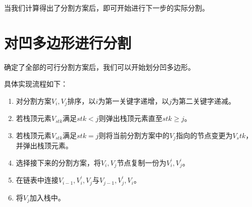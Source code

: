 当我们计算得出了分割方案后，即可开始进行下一步的实际分割。

\section{对凹多边形进行分割}

确定了全部的可行分割方案后，我们可以开始划分凹多边形。

具体实现流程如下：
\begin{enumerate}
    \item 对分割方案\(V_i,V_j\)排序，以\(i\)为第一关键字递增，以\(j\)为第二关键字递减。
    \item 若栈顶元素\(V_{stk}\)满足\(stk<j\)则弹出栈顶元素直至\(stk\ge j\)。
    \item 若栈顶元素\(V_{stk}\)满足\(stk=j\)则将当前分割方案中的\(V_j\)指向的节点变更为\(V_stk\)，并弹出栈顶元素。
    \item 选择接下来的分割方案，将\(V_i,V_j\)节点复制一份为\(V_{i}^{'},V_{j}^{'}\)。
    \item 在链表中连接\(V_{i-1},V_i^{'},V_j\)与\(V_{j-1},V_j^{'},V_i\)。
    \item 将\(V_j\)加入栈中。
\end{enumerate}

